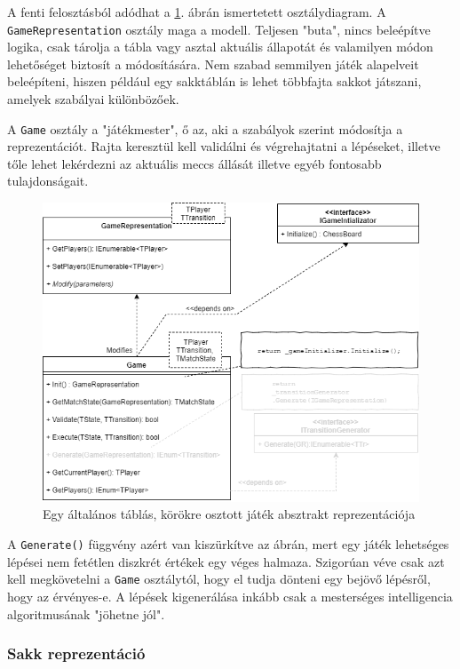 \documentclass[twoside, a4paper, 12pt]{article}
\begin{document}
A fenti felosztásból adódhat a \ref{fig:boardGameAbstractClassDiagram}. ábrán ismertetett osztálydiagram. A \texttt{GameRepresentation} osztály maga a modell. Teljesen "buta", nincs beleépítve logika, csak tárolja a tábla vagy asztal aktuális állapotát és valamilyen módon lehetőséget biztosít a módosítására. Nem szabad semmilyen játék alapelveit beleépíteni, hiszen például egy sakktáblán is lehet többfajta sakkot játszani, amelyek szabályai különbözőek.

A \texttt{Game} osztály a "játékmester", ő az, aki a szabályok szerint módosítja a reprezentációt. Rajta keresztül kell validálni és végrehajtatni a lépéseket, illetve tőle lehet lekérdezni az aktuális meccs állását illetve egyéb fontosabb tulajdonságait.

\begin{figure}[htbp]
	\centering
	\includegraphics[width=\textwidth]{img/boardGameAbstractClassDiagram.png}
	\caption{Egy általános táblás, körökre osztott játék absztrakt reprezentációja}
	\label{fig:boardGameAbstractClassDiagram}
\end{figure}

A \texttt{Generate()} függvény azért van kiszürkítve az ábrán, mert egy játék lehetséges lépései nem fetétlen diszkrét értékek egy véges halmaza. Szigorúan véve csak azt kell megkövetelni a \texttt{Game} osztálytól, hogy el tudja dönteni egy bejövő lépésről, hogy az érvényes-e. A lépések kigenerálása inkább csak a mesterséges intelligencia algoritmusának "jöhetne jól".

\subsubsection{Sakk reprezentáció}
\end{document}

